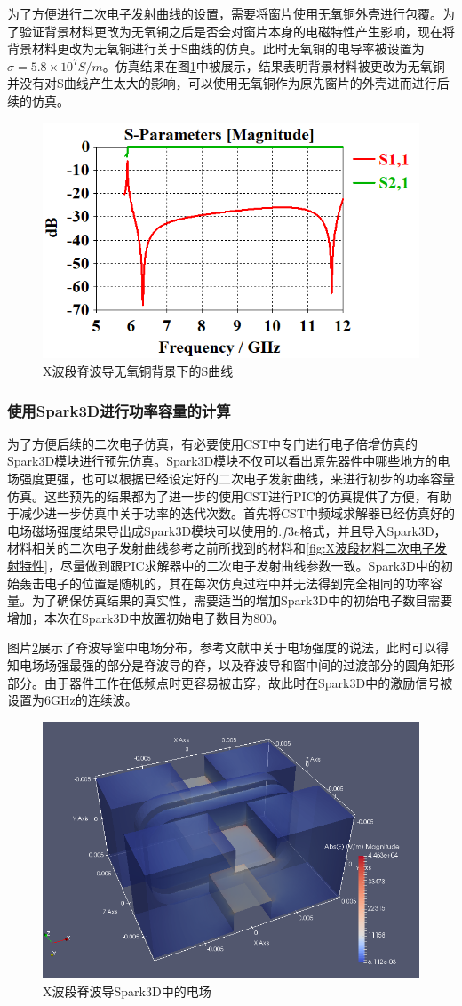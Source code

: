 \documentclass[master]{thesis-uestc}
\begin{document}
为了方便进行二次电子发射曲线的设置，需要将窗片使用无氧铜外壳进行包覆。为了验证背景材料更改为无氧铜之后是否会对窗片本身的电磁特性产生影响，现在将背景材料更改为无氧铜进行关于S曲线的仿真。此时无氧铜的电导率被设置为$\sigma = 5.8 \times 10^7 S/m$。仿真结果在图\ref{fig:X无氧铜背景}中被展示，结果表明背景材料被更改为无氧铜并没有对S曲线产生太大的影响，可以使用无氧铜作为原先窗片的外壳进而进行后续的仿真。
\begin{figure}[!htb]
    \centering
    \includegraphics[width=0.5\linewidth]{pic/chapter3/X脊波导窗无氧铜.png}
    \caption{X波段脊波导无氧铜背景下的S曲线}
    \label{fig:X无氧铜背景}
\end{figure}

\subsubsection{使用Spark3D进行功率容量的计算}
为了方便后续的二次电子仿真，有必要使用CST中专门进行电子倍增仿真的Spark3D模块进行预先仿真。Spark3D模块不仅可以看出原先器件中哪些地方的电场强度更强，也可以根据已经设定好的二次电子发射曲线，来进行初步的功率容量仿真。这些预先的结果都为了进一步的使用CST进行PIC的仿真提供了方便，有助于减少进一步仿真中关于功率的迭代次数。首先将CST中频域求解器已经仿真好的电场磁场强度结果导出成Spark3D模块可以使用的$.f3e$格式，并且导入Spark3D，材料相关的二次电子发射曲线参考之前所找到的材料和\ref{fig:X波段材料二次电子发射特性}，尽量做到跟PIC求解器中的二次电子发射曲线参数一致。Spark3D中的初始轰击电子的位置是随机的，其在每次仿真过程中并无法得到完全相同的功率容量。为了确保仿真结果的真实性，需要适当的增加Spark3D中的初始电子数目需要增加，本次在Spark3D中放置初始电子数目为800。

图片\ref{fig:X波段Spark3D中的电场}展示了脊波导窗中电场分布，参考文献\cite{guobao_2019_intera}中关于电场强度的说法，此时可以得知电场场强最强的部分是脊波导的脊，以及脊波导和窗中间的过渡部分的圆角矩形部分。由于器件工作在低频点时更容易被击穿，故此时在Spark3D中的激励信号被设置为6GHz的连续波。
\begin{figure}[!htb]
    \centering
    \includegraphics[width=0.5\linewidth]{pic/chapter3/X波段Spark3D中的电场.png}
    \caption{X波段脊波导Spark3D中的电场}
    \label{fig:X波段Spark3D中的电场}
\end{figure}
\end{document}
